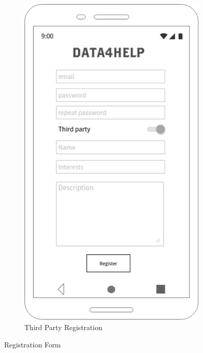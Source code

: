\begin{figure}[h!]
\begin{subfigure}[b]{0.25\linewidth}
    \includegraphics[width=\linewidth]{img/mockup/tp_registration.jpg}

    \caption{Third Party Registration}

  \end{subfigure}

\caption{Registration Form}

\end{figure}

\clearpage

